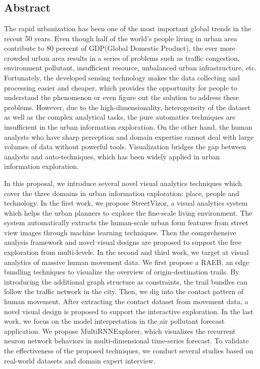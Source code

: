 \chapter{}
\section{Abstract}
The rapid urbanization has been one of the most important global trends in the recent 50 years. Even though half of the world's people living in urban area contribute to 80 percent of GDP(Global Domestic Product), the ever more crowded urban area results in a series of problems such as traffic congestion, environment pollutant, insufficient resource, unbalanced urban infrastructure, etc. Fortunately, the developed sensing technology makes the data collecting and processing easier and cheaper, which provides the opportunity for people to understand the phenomenon or even figure out the solution to address these problems. However, due to the high-dimensionality, heterogeneity of the dataset as well as the complex analytical tasks, the pure automatics techniques are insufficient in the urban information exploration. On the other hand, the human analysts who have sharp perception and domain expertise cannot deal with large volumes of data without powerful tools. Visualization bridges the gap between analysts and auto-techniques, which has been widely applied in urban information exploration. 

In this proposal, we introduce several novel visual analytics techniques which cover the three domains in urban information exploration: place, people and technology. 
In the first work, we propose StreetVizor, a visual analytics system which helps the urban planners to explore the fine-scale living environment. The system automatically extracts the human-scale urban form features from street view images through machine learning techniques. Then the comprehensive analysis framework and novel visual designs are proposed to support the free exploration from multi-levels. 
In the second and third work, we target at visual analytics of massive human movement data. We first propose a RAEB, an edge bundling techniques to visualize the overview of origin-destination trails. By introducing the additional graph structure as constraints, the trail bundles can follow the traffic network in the city. Then, we dig into the contact pattern of human movement. After extracting the contact dataset from movement data, a novel visual design is proposed to support the interactive exploration. 
In the last work, we focus on the model interpretation in the air pollutant forecast application. We propose MultiRNNExplorer, which visualizes the recurrent neuron network behaviors in multi-dimensional time-series forecast. 
To validate the effectiveness of the proposed techniques, we conduct several studies based on real-world datasets and domain expert interview.  

